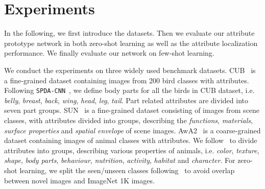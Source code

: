 \section{Experiments}
\label{Experiments}
In the following, we first introduce the datasets. Then we evaluate our attribute prototype network in both zero-shot learning as well as the attribute localization performance. We finally evaluate our network on few-shot learning.

We conduct the experiments on three widely used benchmark datasets. CUB~\citep{26_wah2011caltech} is a fine-grained dataset containing  images from 200 bird classes with  attributes. Following \texttt{SPDA-CNN}~\citep{spdacnn}, we define  body parts for all the birds in CUB dataset, i.e. \textit{belly}, \textit{breast}, \textit{back}, \textit{wing}, \textit{head}, \textit{leg}, \textit{tail}.
Part related attributes are divided into 
seven part groups.
SUN~\citep{25_SUNdataset} is a fine-grained dataset consisting of  images from  scene classes, with  attributes divided into  groups, describing the \textit{functions}, \textit{materials}, \textit{surface properties} and \textit{spatial envelope} of scene images.
AwA2~\citep{xian2018zero} is a coarse-grained dataset containing  images of  animal classes with  
attributes. We follow~\citet{32_awa} to divide  attributes into  groups, describing various properties of animals, i.e. \textit{color}, \textit{texture}, \textit{shape}, \textit{body parts}, \textit{behaviour}, \textit{nutrition}, \textit{activity}, \textit{habitat} and \textit{character}. For zero-shot learning, we split the seen/unseen classes following~\citet{xian2018zero} to avoid overlap between novel images and ImageNet 1K images. 





